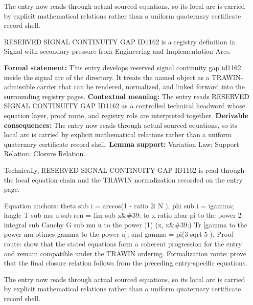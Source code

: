 The entry now reads through actual sourced equations, so its local arc is carried by explicit mathematical relations rather than a uniform quaternary certificate record shell.
\clearpage


\begingroup\small
{}
RESERVED SIGNAL CONTINUITY GAP ID1162 is a registry definition in Signal with secondary pressure from Engineering and Implementation Arcs.

\begingroup\footnotesize\setlength{\emergencystretch}{3em}\sloppy
\textbf{Formal statement:} This entry develops reserved signal continuity gap id1162 inside the signal arc of the directory. It treats the named object as a TRAWIN-admissible carrier that can be rendered, normalized, and linked forward into the surrounding registry pages. \textbf{Contextual meaning:} The entry reads RESERVED SIGNAL CONTINUITY GAP ID1162 as a controlled technical headword whose equation layer, proof route, and registry role are interpreted together. \textbf{Derivable consequences:} The entry now reads through actual sourced equations, so its local arc is carried by explicit mathematical relations rather than a uniform quaternary certificate record shell. \textbf{Lemma support:} Variation Law; Support Relation; Closure Relation.\par
\endgroup

Technically, RESERVED SIGNAL CONTINUITY GAP ID1162 is read through the local equation chain and the TRAWIN normalization recorded on the entry page.

Equation anchors: theta sub i = arccos(1 - ratio 2i N ), phi sub i = igamma; langle T sub mu u sub ren = lim sub x\&\#39; to x ratio hbar pi to the power 2 integral sub Cauchy G sub mu u to the power (1) (x, x\&\#39;) Tr [gamma to the power mu otimes gamma to the power u]; and gamma = pi(3-sqrt 5 ). Proof route: show that the stated equations form a coherent progression for the entry and remain compatible under the TRAWIN ordering. Formalization route: prove that the final closure relation follows from the preceding entry-specific equations.

The entry now reads through actual sourced equations, so its local arc is carried by explicit mathematical relations rather than a uniform quaternary certificate record shell.
\endgroup

